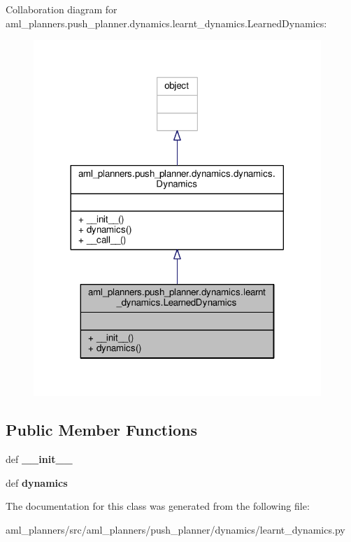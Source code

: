 Collaboration diagram for aml\-\_\-planners.\-push\-\_\-planner.\-dynamics.\-learnt\-\_\-dynamics.\-Learned\-Dynamics\-:\nopagebreak
\begin{figure}[H]
\begin{center}
\leavevmode
\includegraphics[width=308pt]{classaml__planners_1_1push__planner_1_1dynamics_1_1learnt__dynamics_1_1_learned_dynamics__coll__graph}
\end{center}
\end{figure}
\subsection*{Public Member Functions}
\begin{DoxyCompactItemize}
\item 
\hypertarget{classaml__planners_1_1push__planner_1_1dynamics_1_1learnt__dynamics_1_1_learned_dynamics_a788c6dd487c5b8c1b76eb366b0240bf9}{def {\bfseries \-\_\-\-\_\-init\-\_\-\-\_\-}}\label{classaml__planners_1_1push__planner_1_1dynamics_1_1learnt__dynamics_1_1_learned_dynamics_a788c6dd487c5b8c1b76eb366b0240bf9}

\item 
\hypertarget{classaml__planners_1_1push__planner_1_1dynamics_1_1learnt__dynamics_1_1_learned_dynamics_a789eccdf00110cd2b3de786010fd54fb}{def {\bfseries dynamics}}\label{classaml__planners_1_1push__planner_1_1dynamics_1_1learnt__dynamics_1_1_learned_dynamics_a789eccdf00110cd2b3de786010fd54fb}

\end{DoxyCompactItemize}


The documentation for this class was generated from the following file\-:\begin{DoxyCompactItemize}
\item 
aml\-\_\-planners/src/aml\-\_\-planners/push\-\_\-planner/dynamics/learnt\-\_\-dynamics.\-py\end{DoxyCompactItemize}
